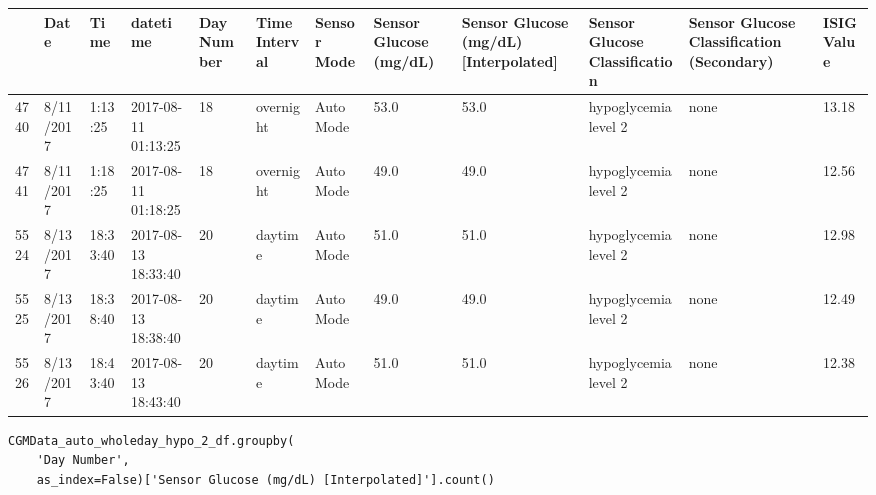 \bigskip\noindent
\begin{tabular}{p{}p{}p{}p{}p{}p{}p{}p{}p{}p{}p{}p{}}
\toprule
 & Date & Time & datetime & Day Number & Time Interval & Sensor Mode & Sensor Glucose (mg/dL) & Sensor Glucose (mg/dL) [Interpolated] & Sensor Glucose Classification & Sensor Glucose Classification (Secondary) & ISIG Value \\
\hline
4740 & 8/11/2017 & 1:13:25 & 2017-08-11 01:13:25 & 18 & overnight & Auto Mode & 53.0 & 53.0 & hypoglycemia level 2 & none & 13.18 \\
\hline
4741 & 8/11/2017 & 1:18:25 & 2017-08-11 01:18:25 & 18 & overnight & Auto Mode & 49.0 & 49.0 & hypoglycemia level 2 & none & 12.56 \\
\hline
5524 & 8/13/2017 & 18:33:40 & 2017-08-13 18:33:40 & 20 & daytime & Auto Mode & 51.0 & 51.0 & hypoglycemia level 2 & none & 12.98 \\
\hline
5525 & 8/13/2017 & 18:38:40 & 2017-08-13 18:38:40 & 20 & daytime & Auto Mode & 49.0 & 49.0 & hypoglycemia level 2 & none & 12.49 \\
\hline
5526 & 8/13/2017 & 18:43:40 & 2017-08-13 18:43:40 & 20 & daytime & Auto Mode & 51.0 & 51.0 & hypoglycemia level 2 & none & 12.38 \\
\hline
\bottomrule
\end{tabular}

\bigskip

\begin{verbatim}
CGMData_auto_wholeday_hypo_2_df.groupby(
    'Day Number', 
    as_index=False)['Sensor Glucose (mg/dL) [Interpolated]'].count()
\end{verbatim}

